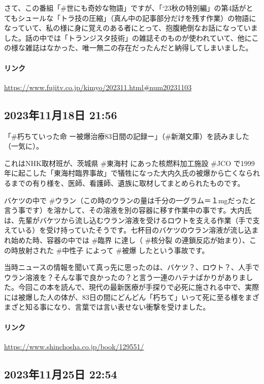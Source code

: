 \documentclass[facebook_diary.tex]{subfiles}
\begin{document}
さて、この番組「\#世にも奇妙な物語」ですが、「‘23秋の特別編」の第4話がとてもシュールな「トラ技の圧縮」（真ん中の記事部分だけを残す作業）の物語になっていて、私の様に身に覚えのある者にとって、抱腹絶倒なお話になっていました。話の中では「トランジスタ技術」の雑誌そのものが使われていて、他にこの様な雑誌はなかった、唯一無二の存在だったんだと納得してしまいました。

\paragraph{リンク}
\url{https://www.fujitv.co.jp/kimyo/202311.html\#num20231103}

\subsection*{2023年11月18日 21:56}

「\#朽ちていった命 ー被爆治療83日間の記録ー」（\#新潮文庫）を読みました（一気に）。

これはNHK取材班が、茨城県 \#東海村 にあった核燃料加工施設 \#JCO で1999年に起こした「東海村臨界事故」で犠牲になった大内久氏の被爆から亡くなられるまでの有り様を、医師、看護師、遺族に取材してまとめられたものです。

バケツの中で \#ウラン（この時のウランの量は千分の一グラム＝１mgだったと言う事です）を溶かして、その溶液を別の容器に移す作業中の事です。大内氏は、先輩がバケツから流し込むウラン溶液を受けるロウトを支える作業（手で支えている）を受け持っていたそうです。七杯目のバケツのウラン溶液が流し込まれ始めた時、容器の中では \#臨界 に達し（ \#核分裂 の連鎖反応が始まり）、この時放射された \#中性子 によって \#被爆 したという事故です。

当時ニュースの情報を聞いて真っ先に思ったのは、バケツ？、ロウト？、人手でウラン溶液を？そんな事で良かったの？と言う一連のハテナばかりがありました。今回この本を読んで、現代の最新医療が手探りで必死に施される中で、実際には被爆した人の体が、83日の間にどんどん「朽ちて」いって死に至る様をまざまざと知る事になり、言葉では言い表せない衝撃を受けました。

\paragraph{リンク}
\url{https://www.shinchosha.co.jp/book/129551/}

\subsection*{2023年11月25日 22:54}
\end{document}
